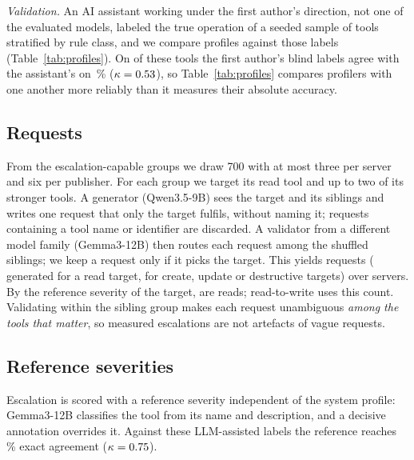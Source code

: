 \emph{Validation.} An AI assistant working under the first author's direction, not one of the evaluated
models, labeled the true operation of a seeded sample of \NumAuditTools{} tools stratified by rule
class, and we compare profiles against those labels (Table~\ref{tab:profiles}). On \RaterToolN{} of
these tools the first author's blind labels agree with the assistant's on \RaterToolAgree\,\%
($\kappa=0.53$), so Table~\ref{tab:profiles} compares profilers with one another more
reliably than it measures their absolute accuracy.

\subsection{Requests}
From the escalation-capable groups we draw 700 with at most three per server and six per
publisher. For each group we target its read tool and up to two of its stronger tools. A
generator (Qwen3.5-9B) sees the target and its siblings and writes one request that only the
target fulfils, without naming it; requests containing a tool name or identifier are discarded.
A validator from a different model family (Gemma3-12B) then routes each request among the shuffled
siblings; we keep a request only if it picks the target. This yields \NumQueries{} requests
(\NumQueriesRead{} generated for a read target, \NumQueriesWrite{} for create, update or destructive
targets) over \NumQueryServers{} servers. By the reference severity of the target, \ReadReqs{} are
reads; read-to-write uses this count. Validating within the sibling group makes each request unambiguous
\emph{among the tools that matter}, so measured escalations are not artefacts of vague requests.

\subsection{Reference severities}
Escalation is scored with a reference severity independent of the system profile: Gemma3-12B
classifies the tool from its name and description, and a decisive annotation overrides it.
Against these LLM-assisted labels the reference reaches \RefExact{}\,\% exact agreement
($\kappa=0.75$).

